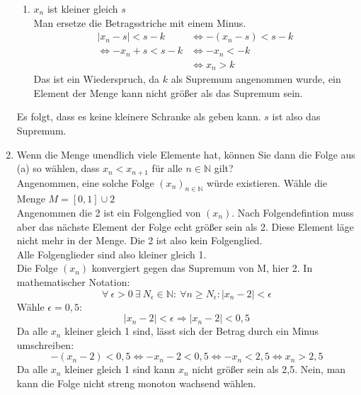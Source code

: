 \documentclass[11pt]{article}
\begin{document}
\begin{enumerate}[ label= (\alph*) ]
\begin{enumerate}[ label = \arabic*. Fall ]
            \item \(x_n\) ist kleiner gleich \(s\) \\
            Man ersetze  die Betragsstriche mit einem Minus.
            \begin{align*}
                |x_n - s| < s - k &\Leftrightarrow -(x_n - s) < s - k \\
                  \Leftrightarrow -x_n + s < s - k &\Leftrightarrow - x_n < - k \\
                  &\Leftrightarrow x_n > k
            \end{align*}
            Das ist ein Wiederspruch, da \(k\) als Supremum angenommen wurde, ein Element der Menge kann nicht größer als das Supremum sein.
        \end{enumerate}
        Es folgt, dass es keine kleinere Schranke als geben kann. \(s\) ist also das Supremum.

        \item Wenn die Menge unendlich viele Elemente hat, können Sie dann die Folge aus (a) so wählen, dass \( x_n < x_{n+1} \) für alle \( n \in \mathbb{N} \) gilt? \\
        Angenommen, eine solche Folge \( { (x_n) }_{ n \in \mathbb{N} } \) würde existieren. Wähle die Menge \(M = [0,1] \cup {2} \) \\
        Angenommen die 2 ist ein Folgenglied von \((x_n)\). Nach Folgendefintion muss aber das nächste Element der Folge
        echt größer sein als 2. Diese Element läge nicht mehr in der Menge. Die 2 ist also kein Folgenglied. \\
        Alle Folgenglieder sind also kleiner gleich 1. \\
        Die Folge \((x_n)\) konvergiert gegen das Supremum von M, hier 2. In mathematischer Notation:
        \[\forall \: \epsilon > 0 \: \exists \: N_{\epsilon} \in \mathbb{N}: \: \forall n \geq N_{\epsilon}: |x_n - 2| < \epsilon \]
        Wähle \( \epsilon = 0,5 \):
        \[ |x_n - 2| < \epsilon \Rightarrow |x_n - 2| < 0,5\]
        Da alle \(x_n\) kleiner gleich 1 sind, lässt sich der Betrag durch ein Minus umschreiben:
        \[ -(x_n - 2) < 0,5 \Leftrightarrow -x_n -2 < 0,5 \Leftrightarrow -x_n < 2,5 \Leftrightarrow x_n > 2,5 \]
        Da alle \(x_n\) kleiner gleich 1 sind kann \(x_n\) nicht größer sein als 2,5.
        Nein, man kann die Folge nicht streng monoton wachsend wählen.
    \end{enumerate}
    
\end{document}
